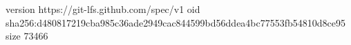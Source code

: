 version https://git-lfs.github.com/spec/v1
oid sha256:d480817219cba985c36ade2949cac844599bd56ddea4bc77553fb54810d8ce95
size 73466
